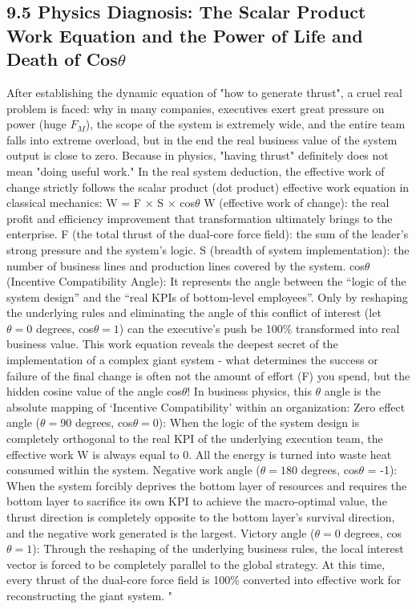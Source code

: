 \documentclass[11pt,a4paper]{article}
\begin{document}
\subsection*{9.5 Physics Diagnosis: The Scalar Product Work Equation and the Power of Life and Death of Cos$\theta$}


After establishing the dynamic equation of "how to generate thrust", a cruel real problem is faced: why in many companies, executives exert great pressure on power (huge $F_M$), the scope of the system is extremely wide, and the entire team falls into extreme overload, but in the end the real business value of the system output is close to zero. Because in physics, "having thrust" definitely does not mean "doing useful work." In the real system deduction, the effective work of change strictly follows the scalar product (dot product) effective work equation in classical mechanics: W = F $\times$ S $\times$ cos$\theta$ W (effective work of change): the real profit and efficiency improvement that transformation ultimately brings to the enterprise. F (the total thrust of the dual-core force field): the sum of the leader’s strong pressure and the system’s logic. S (breadth of system implementation): the number of business lines and production lines covered by the system. cos$\theta$ (Incentive Compatibility Angle): It represents the angle between the “logic of the system design” and the “real KPIs of bottom-level employees”. Only by reshaping the underlying rules and eliminating the angle of this conflict of interest (let $\theta = 0$ degrees, cos$\theta = 1$) can the executive’s push be 100\% transformed into real business value. This work equation reveals the deepest secret of the implementation of a complex giant system - what determines the success or failure of the final change is often not the amount of effort (F) you spend, but the hidden cosine value of the angle cos$\theta$! In business physics, this $\theta$ angle is the absolute mapping of ‘Incentive Compatibility’ within an organization: Zero effect angle ($\theta = 90$ degrees, cos$\theta = 0$): When the logic of the system design is completely orthogonal to the real KPI of the underlying execution team, the effective work W is always equal to 0. All the energy is turned into waste heat consumed within the system. Negative work angle ($\theta = 180$ degrees, cos$\theta$ = -1): When the system forcibly deprives the bottom layer of resources and requires the bottom layer to sacrifice its own KPI to achieve the macro-optimal value, the thrust direction is completely opposite to the bottom layer’s survival direction, and the negative work generated is the largest. Victory angle ($\theta = 0$ degrees, cos$\theta = 1$): Through the reshaping of the underlying business rules, the local interest vector is forced to be completely parallel to the global strategy. At this time, every thrust of the dual-core force field is 100\% converted into effective work for reconstructing the giant system. "
\end{document}
